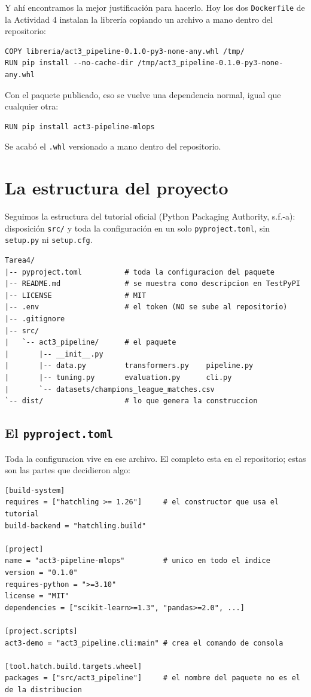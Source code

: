 \documentclass[12pt,a4paper]{article}
\begin{document}
Y ahí encontramos la mejor justificación para hacerlo. Hoy los dos \texttt{Dockerfile} de la
Actividad 4 instalan la librería copiando un archivo a mano dentro del repositorio:

\begin{verbatim}
COPY libreria/act3_pipeline-0.1.0-py3-none-any.whl /tmp/
RUN pip install --no-cache-dir /tmp/act3_pipeline-0.1.0-py3-none-any.whl
\end{verbatim}

Con el paquete publicado, eso se vuelve una dependencia normal, igual que cualquier otra:

\begin{verbatim}
RUN pip install act3-pipeline-mlops
\end{verbatim}

Se acabó el \texttt{.whl} versionado a mano dentro del repositorio.

\section{La estructura del proyecto}

Seguimos la estructura del tutorial oficial (Python Packaging Authority, s.f.-a): disposición
\texttt{src/} y toda la configuración en un solo \texttt{pyproject.toml}, sin
\texttt{setup.py} ni \texttt{setup.cfg}.

\begin{verbatim}
Tarea4/
|-- pyproject.toml          # toda la configuracion del paquete
|-- README.md               # se muestra como descripcion en TestPyPI
|-- LICENSE                 # MIT
|-- .env                    # el token (NO se sube al repositorio)
|-- .gitignore
|-- src/
|   `-- act3_pipeline/      # el paquete
|       |-- __init__.py
|       |-- data.py         transformers.py    pipeline.py
|       |-- tuning.py       evaluation.py      cli.py
|       `-- datasets/champions_league_matches.csv
`-- dist/                   # lo que genera la construccion
\end{verbatim}

\subsection{El \texttt{pyproject.toml}}

Toda la configuracion vive en ese archivo. El completo esta en el repositorio; estas son las
partes que decidieron algo:

\begin{verbatim}
[build-system]
requires = ["hatchling >= 1.26"]     # el constructor que usa el tutorial
build-backend = "hatchling.build"

[project]
name = "act3-pipeline-mlops"         # unico en todo el indice
version = "0.1.0"
requires-python = ">=3.10"
license = "MIT"
dependencies = ["scikit-learn>=1.3", "pandas>=2.0", ...]

[project.scripts]
act3-demo = "act3_pipeline.cli:main" # crea el comando de consola

[tool.hatch.build.targets.wheel]
packages = ["src/act3_pipeline"]     # el nombre del paquete no es el de la distribucion
\end{verbatim}
\end{document}
